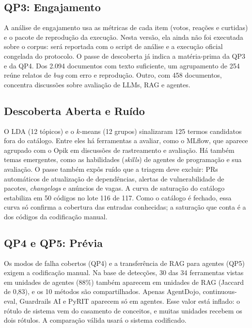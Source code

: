 \documentclass[sigconf]{acmart}
\begin{document}
\subsection{QP3: Engajamento}

A análise de engajamento usa as métricas de cada item (votos, reações e curtidas) e o pacote de reprodução da execução. Nesta versão, ela ainda não foi executada sobre o corpus: será reportada com o script de análise e a execução oficial congelada do protocolo. %
O passe de descoberta já indica a matéria-prima da QP3 e da QP4. Dos 2.094 documentos com texto suficiente, um agrupamento de 254 reúne relatos de \textit{bug} com erro e reprodução. Outro, com 458 documentos, concentra discussões sobre avaliação de LLMs, RAG e agentes.

\subsection{Descoberta Aberta e Ruído}

O LDA (12 tópicos) e o $k$-means (12 grupos) sinalizaram 125 termos candidatos fora do catálogo. Entre eles há ferramentas a avaliar, como o MLflow, que aparece agrupado com o Opik em discussões de rastreamento e avaliação. Há também temas emergentes, como as habilidades (\textit{skills}) de agentes de programação e sua avaliação. O passe também expôs ruído que a triagem deve excluir: PRs automáticos de atualização de dependências, alertas de vulnerabilidade de pacotes, \textit{changelogs} e anúncios de vagas. A curva de saturação do catálogo estabiliza em 50 códigos no lote 116 de 117. Como o catálogo é fechado, essa curva só confirma a cobertura das entradas conhecidas; a saturação que conta é a dos códigos da codificação manual.

\subsection{QP4 e QP5: Prévia}

Os modos de falha cobertos (QP4) e a transferência de RAG para agentes (QP5) exigem a codificação manual. Na base de detecções, 30 das 34 ferramentas vistas em unidades de agentes (88\%) também aparecem em unidades de RAG (Jaccard de 0,83), e os 10 métodos são compartilhados. Apenas AgentDojo, continuous-eval, Guardrails AI e PyRIT aparecem só em agentes. Esse valor está inflado: o rótulo de sistema vem do casamento de conceitos, e muitas unidades recebem os dois rótulos. A comparação válida usará o sistema codificado.
\end{document}
